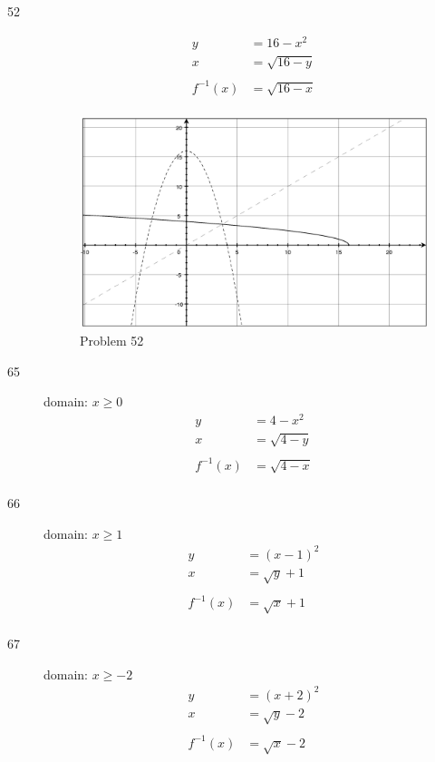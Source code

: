 \documentclass{exam}
\begin{document}
\begin{description}
    \item[52]
      \begin{align*}
        y &= 16 - x^2 \\
        x &= \sqrt{16 - y} \\
        \\
        f^{-1}(x) &= \sqrt{16 - x} \\
      \end{align*}

      \begin{figure}[H]
        \centering
        \includegraphics[scale=.3]{problem_52.eps}
        \caption*{Problem 52}
      \end{figure}
    
    \item[65]
      domain: $x \geq 0$
      \begin{align*}
        y &= 4 - x^2 \\
        x &= \sqrt{4 - y} \\
        \\
        f^{-1}(x) &= \sqrt{4 - x} \\
      \end{align*}

    \item[66]
      domain: $x \geq 1$
      \begin{align*}
        y &= (x - 1)^2 \\
        x &= \sqrt{y} + 1 \\
        \\
        f^{-1}(x) &= \sqrt{x} + 1 \\
      \end{align*}

    \item[67]
      domain: $x \geq -2$
      \begin{align*}
        y &= (x + 2)^2 \\
        x &= \sqrt{y} - 2 \\
        \\
        f^{-1}(x) &= \sqrt{x} - 2 \\
      \end{align*}


\end{description}
\end{document}
